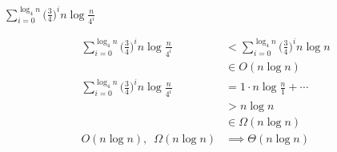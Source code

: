 \question $\displaystyle\sum_{i = 0}^{\log_4{n}} \Big(\frac{3}{4}\Big)^i n\log{\frac{n}{4^i}}$
\begin{solution}[2in]
\begin{align*}
\sum_{i = 0}^{\log_4{n}} \Big(\frac{3}{4}\Big)^i n\log{\frac{n}{4^i}}
&< \sum_{i = 0}^{\log_4{n}} \Big(\frac{3}{4}\Big)^i n\log{n} \\
&\in O(n\log{n}) \\
\sum_{i = 0}^{\log_4{n}} \Big(\frac{3}{4}\Big)^i n\log{\frac{n}{4^i}}
&= 1 \cdot n\log{\frac{n}{1}} + \cdots \\
&> n\log{n} \\
&\in \Omega(n\log{n}) \\
O(n\log{n}), \enspace \Omega(n\log{n}) &\implies \Theta(n\log{n})
\end{align*}
\end{solution}